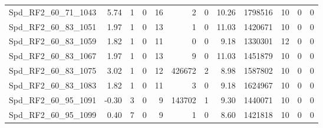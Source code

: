 \begin{longtable}[c]{@{}lrrrrrrrrrrr@{}}
Spd\_RF2\_60\_71\_1043        & 5.74                   & 1                       & 0                       & 16                     & 2                       & 0                       & 10.26                   & 1798516                  & 10                       & 0                        & 0                        \\
Spd\_RF2\_60\_83\_1051        & 1.97                   & 1                       & 0                       & 13                     & 1                       & 0                       & 11.03                   & 1420671                  & 10                       & 0                        & 0                        \\
Spd\_RF2\_60\_83\_1059        & 1.82                   & 1                       & 0                       & 11                     & 0                       & 0                       & 9.18                    & 1330301                  & 12                       & 0                        & 0                        \\
Spd\_RF2\_60\_83\_1067        & 1.97                   & 1                       & 0                       & 13                     & 9                       & 0                       & 11.03                   & 1451879                  & 10                       & 0                        & 0                        \\
Spd\_RF2\_60\_83\_1075        & 3.02                   & 1                       & 0                       & 12                     & 426672                  & 2                       & 8.98                    & 1587802                  & 10                       & 0                        & 0                        \\
Spd\_RF2\_60\_83\_1083        & 1.82                   & 1                       & 0                       & 11                     & 3                       & 0                       & 9.18                    & 1624967                  & 10                       & 0                        & 0                        \\
Spd\_RF2\_60\_95\_1091        & -0.30                  & 3                       & 0                       & 9                      & 143702                  & 1                       & 9.30                    & 1440071                  & 10                       & 0                        & 0                        \\
Spd\_RF2\_60\_95\_1099        & 0.40                   & 7                       & 0                       & 9                      & 1                       & 0                       & 8.60                    & 1421818                  & 10                       & 0                        & 0                        \\

\end{longtable}
